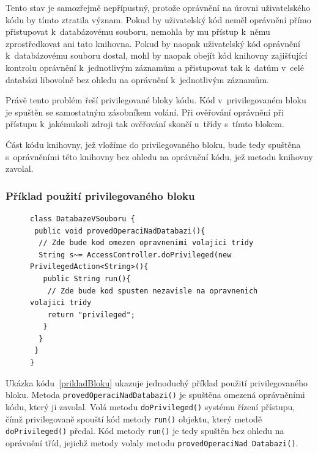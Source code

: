 Tento stav je samozřejmě nepřípustný, protože oprávnění na úrovni uživatelského kódu by tímto ztratila význam. Pokud by uživatelský kód neměl oprávnění přímo přistupovat k~databázovému souboru, nemohla by mu přístup k~němu zprostředkovat ani tato knihovna. Pokud by naopak uživatelský kód oprávnění k~databázovému souboru dostal, mohl by naopak obejít kód knihovny zajišťující kontrolu oprávnění k~jednotlivým záznamům a přistupovat tak k~datům v~celé databázi libovolně bez ohledu na oprávnění k~jednotlivým záznamům.

Právě tento problém řeší privilegované bloky kódu. Kód v~privilegovaném bloku je spuštěn se samostatným zásobníkem volání. Při ověřování oprávnění při přístupu k~jakémukoli zdroji tak ověřování skončí u~třídy s~tímto blokem.~\cite{refAccessController}

Část kódu knihovny, jež vložíme do privilegovaného bloku, bude tedy spuštěna s~oprávněními této knihovny bez ohledu na oprávnění kódu, jež metodu knihovny zavolal.

\pagebreak
\subsubsection{Příklad použití privilegovaného bloku}

\begin{figure}[tbh]
\begin{lstlisting}[caption=Příklad použití privilegovaného bloku~\cite{refAccessController}, label=prikladBloku]
class DatabazeVSouboru {
 public void provedOperaciNadDatabazi(){
  // Zde bude kod omezen opravnenimi volajici tridy
  String s~= AccessController.doPrivileged(new PrivilegedAction<String>(){
   public String run(){
    // Zde bude kod spusten nezavisle na opravnenich volajici tridy
    return "privileged";
   }
  }
 }
}
\end{lstlisting}
\end{figure}

Ukázka kódu~\ref{prikladBloku} ukazuje jednoduchý příklad použití privilegovaného bloku.
Metoda {\tt provedOperaciNadDatabazi()} je spuštěna omezená oprávněními kódu, který ji zavolal.
Volá metodu {\tt doPrivileged()} systému řízení přístupu, čímž privilegovaně spouští kód metody {\tt run()} objektu, který metodě {\tt doPrivileged()} předal.
Kód metody {\tt run()} je tedy spuštěn bez ohledu na oprávnění tříd, jejichž metody volaly metodu {\tt provedOperaciNad Databazi()}.

